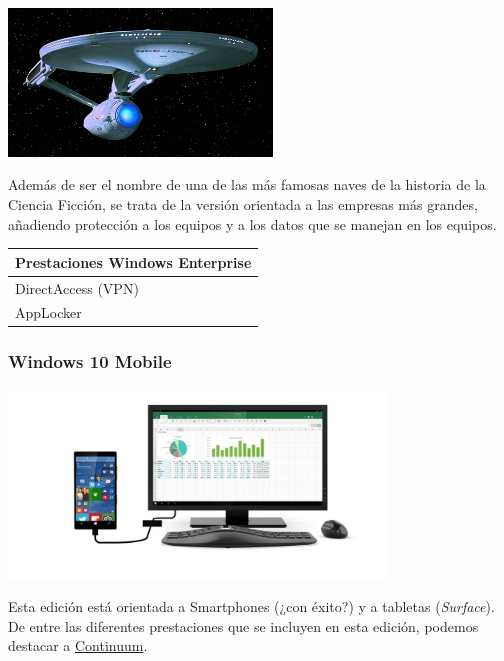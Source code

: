 \documentclass[11pt]{article}
\begin{document}
\begin{center}
\includegraphics[width=7cm]{./imgs/win10-enterprise.jpg}
\end{center}

Además de ser el nombre de una de las más famosas naves de la historia de la Ciencia Ficción, 
se trata de la versión orientada a las empresas más grandes, añadiendo protección a los equipos
y a los datos que se manejan en los equipos.

\begin{center}
\begin{tabular}{l}
Prestaciones Windows Enterprise\\
\hline
DirectAccess (VPN)\\
AppLocker\\
\end{tabular}
\end{center}


\newpage
\subsubsection{Windows 10 Mobile}
\label{sec:org689cebd}

\begin{center}
\includegraphics[width=10cm]{./imgs/win10-mobile.jpg}
\end{center}

Esta edición está orientada a Smartphones (¿con éxito?) y a tabletas (\emph{Surface}). 
De entre las diferentes prestaciones que se incluyen en esta edición, podemos destacar
a \href{https://www.microsoft.com/es-es/windows/continuum}{Continuum}.
\end{document}
